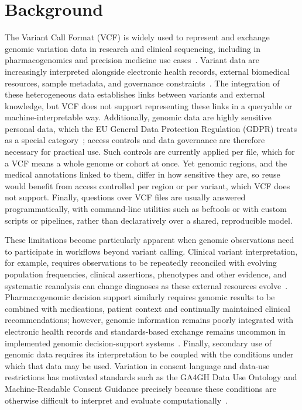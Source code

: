 \documentclass[pdflatex,sn-mathphys-num]{sn-jnl}
\begin{document}
\section{Background}\label{sec1}
The Variant Call Format (VCF) is widely used to represent and exchange genomic variation data in research and clinical sequencing, including in pharmacogenomics and precision medicine use cases~\cite{vcf_spec_2024,pharmcat,souche_recommendations_2022}.
Variant data are increasingly interpreted alongside electronic health records, external biomedical resources, sample metadata, and governance constraints~\cite{gottesman2013emerge,allofus2024genomic}.
The integration of these heterogeneous data establishes links between variants and external knowledge, but VCF does not support representing these links in a queryable or machine-interpretable way.
Additionally, genomic data are highly sensitive personal data, which the EU General Data Protection Regulation (GDPR) treats as a special category~\cite{gdpr2016,shabani2018gdpr}; access controls and data governance are therefore necessary for practical use.
Such controls are currently applied per file, which for a VCF means a whole genome or cohort at once.
Yet genomic regions, and the medical annotations linked to them, differ in how sensitive they are, so reuse would benefit from access controlled per region or per variant, which VCF does not support.
Finally, questions over VCF files are usually answered programmatically, with command-line utilities such as bcftools \cite{BCFtools} or with custom scripts or pipelines, rather than declaratively over a shared, reproducible model.

These limitations become particularly apparent when genomic observations need to participate in workflows beyond variant calling. 
Clinical variant interpretation, for example, requires observations to be repeatedly reconciled with evolving population frequencies, clinical assertions, phenotypes and other evidence, and systematic reanalysis can change diagnoses as these external resources evolve~\cite{richards2015standards,hiatt2018systematic,deignan2019reevaluation}. 
Pharmacogenomic decision support similarly requires genomic results to be combined with medications, patient context and continually maintained clinical recommendations; however, genomic information remains poorly integrated with electronic health records and standards-based exchange remains uncommon in implemented genomic decision-support systems~\cite{wake2022pgx,johnson2024genetically}. 
Finally, secondary use of genomic data requires its interpretation to be coupled with the conditions under which that data may be used. 
Variation in consent language and data-use restrictions has motivated standards such as the GA4GH Data Use Ontology and Machine-Readable Consent Guidance precisely because these conditions are otherwise difficult to interpret and evaluate computationally~\cite{lawson2021duo,rehm2021ga4gh}.
\end{document}
